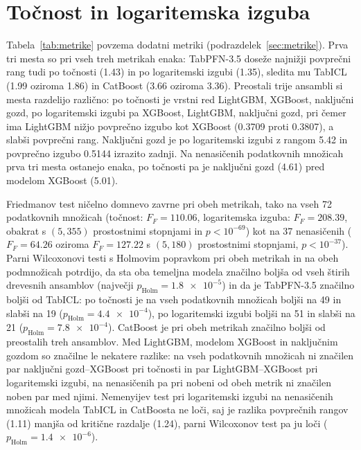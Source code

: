 \documentclass[a4paper,12pt,openright]{book}
\begin{document}
\section{Točnost in logaritemska izguba}
\label{sec:rez-metrike}

Tabela~\ref{tab:metrike} povzema dodatni metriki (podrazdelek~\ref{sec:metrike}).
Prva tri mesta so pri vseh treh metrikah enaka: TabPFN-3.5 doseže najnižji
povprečni rang tudi po točnosti (\num{1.43}) in po logaritemski izgubi
(\num{1.35}), sledita mu TabICL (\num{1.99} oziroma \num{1.86}) in CatBoost
(\num{3.66} oziroma \num{3.36}). Preostali trije ansambli si mesta razdelijo
različno: po točnosti je vrstni red LightGBM, XGBoost, naključni gozd, po
logaritemski izgubi pa XGBoost, LightGBM, naključni gozd, pri čemer ima LightGBM
nižjo povprečno izgubo kot XGBoost (\num{0.3709} proti \num{0.3807}), a slabši
povprečni rang. Naključni gozd je po logaritemski izgubi z rangom \num{5.42} in
povprečno izgubo \num{0.5144} izrazito zadnji. Na nenasičenih podatkovnih
množicah prva tri mesta ostanejo enaka, po točnosti pa je naključni gozd
(\num{4.61}) pred modelom XGBoost (\num{5.01}).



Friedmanov test ničelno domnevo zavrne pri obeh metrikah, tako na vseh 72
podatkovnih množicah (točnost: $F_F = \num{110.06}$, logaritemska izguba: $F_F =
\num{208.39}$, obakrat s $(5, 355)$ prostostnimi stopnjami in $p < 10^{-69}$) kot
na 37 nenasičenih ($F_F = \num{64.26}$ oziroma $F_F = \num{127.22}$ s $(5, 180)$
prostostnimi stopnjami, $p < 10^{-37}$). Parni Wilcoxonovi testi s Holmovim
popravkom pri obeh metrikah in na obeh podmnožicah potrdijo, da sta oba
temeljna modela značilno boljša od vseh štirih drevesnih ansamblov (največji
$p_\mathrm{Holm} = \num{1.8e-5}$) in da je TabPFN-3.5 značilno boljši od TabICL:
po točnosti je na vseh podatkovnih množicah boljši na 49 in slabši na 19
($p_\mathrm{Holm} = \num{4.4e-4}$), po logaritemski izgubi boljši na 51 in slabši
na 21 ($p_\mathrm{Holm} = \num{7.8e-4}$). CatBoost je pri obeh metrikah značilno
boljši od preostalih treh ansamblov. Med LightGBM, modelom XGBoost in
naključnim gozdom so značilne le nekatere razlike: na vseh podatkovnih množicah
ni značilen par naključni gozd--XGBoost pri točnosti in par LightGBM--XGBoost
pri logaritemski izgubi, na nenasičenih pa pri nobeni od obeh metrik ni
značilen noben par med njimi. Nemenyijev test pri logaritemski izgubi na
nenasičenih množicah modela TabICL in CatBoosta ne loči, saj je razlika
povprečnih rangov (\num{1.11}) manjša od kritične razdalje (\num{1.24}), parni
Wilcoxonov test pa ju loči ($p_\mathrm{Holm} = \num{1.4e-6}$).
\end{document}
